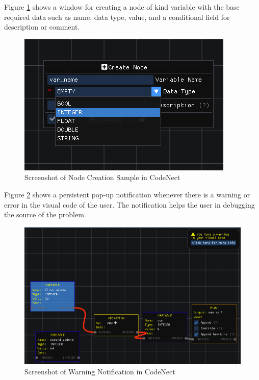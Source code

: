 \parx
Figure \ref{fig:cn_node_create} shows a window for creating a node of kind
variable with the base required data such as name, data type, value, and a
conditional field for description or comment.

\begin{figure}[H]
	\centering
	\captionsetup{justification=centering}
	\captionsetup[figure]{list=yes}
	\includegraphics[width=\linewidth]{media/sc_node_creation_sample.png}
	\caption[Screenshot of Node Creation Sample in CodeNect]{Screenshot of Node Creation Sample in CodeNect}
	\label{fig:cn_node_create}
\end{figure}

\parx
Figure \ref{fig:cn_warning} shows a persistent pop-up notification whenever there is
a warning or error in the visual code of the user. The notification helps the user
in debugging the source of the problem.

\begin{figure}[H]
	\centering
	\captionsetup{justification=centering}
	\captionsetup[figure]{list=yes}
	\includegraphics[width=\linewidth]{media/sc_warning_popup.png}
	\caption[Screenshot of Warning Notification in CodeNect]{Screenshot of Warning Notification in CodeNect}
	\label{fig:cn_warning}
\end{figure}
